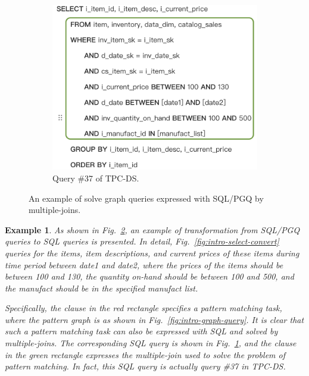 \documentclass[sigconf, nonacm]{acmart}
\newtheorem{example}{Example}
\begin{document}
\begin{figure}
\begin{subfigure}[b]{0.25\linewidth}
        \centering
        \includegraphics[width=\linewidth]{./figures/intro-select.png}
        \caption{Query \#37 of TPC-DS.}
        \label{fig:intro-tpcds-query}
    \end{subfigure}
    \caption{An example of solve graph queries expressed with SQL/PGQ by multiple-joins.}
    \label{fig:intro-example}
\end{figure}

\begin{example}
\label{example:intro}
As shown in Fig.~\ref{fig:intro-example}, an example of transformation from SQL/PGQ queries to SQL queries is presented.
In detail, Fig.~\ref{fig:intro-select-convert} queries for the items, item descriptions, and current prices of these items during time period between date1 and date2, where the prices of the items should be between 100 and 130, the quantity on-hand should be between 100 and 500, and the manufact should be in the specified manufact list.

Specifically, the clause in the red rectangle specifies a pattern matching task, where the pattern graph is as shown in Fig.~\ref{fig:intro-graph-query}.
It is clear that such a pattern matching task can also be expressed with SQL and solved by multiple-joins.
The corresponding SQL query is shown in Fig.~\ref{fig:intro-tpcds-query}, and the clause in the green rectangle expresses the multiple-join used to solve the problem of pattern matching.
In fact, this SQL query is actually query \#37 in TPC-DS.
\end{example}
\end{document}
